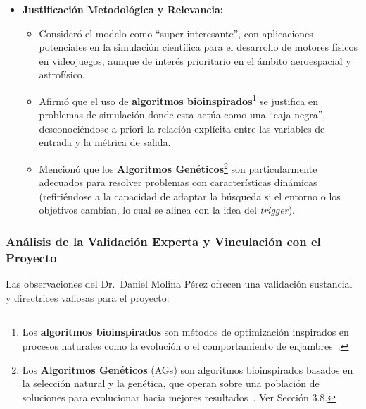 \begin{itemize}
    \item \textbf{Justificación Metodológica y Relevancia:}
    \begin{itemize}
        \item Consideró el modelo como ``super interesante'', con aplicaciones potenciales en la simulación científica para el desarrollo de motores físicos en videojuegos, aunque de interés prioritario en el ámbito aeroespacial y astrofísico.
        \item Afirmó que el uso de \textbf{algoritmos bioinspirados}\footnote{Los \textbf{algoritmos bioinspirados} son métodos de optimización inspirados en procesos naturales como la evolución o el comportamiento de enjambres~\cite{eiben2015, goldberg1989}.} se justifica en problemas de simulación donde esta actúa como una ``caja negra'', desconociéndose a priori la relación explícita entre las variables de entrada y la métrica de salida.
        \item Mencionó que los \textbf{Algoritmos Genéticos}\footnote{Los \textbf{Algoritmos Genéticos} (AGs) son algoritmos bioinspirados basados en la selección natural y la genética, que operan sobre una población de soluciones para evolucionar hacia mejores resultados~\cite{goldberg1989}. Ver Sección 3.8.} son particularmente adecuados para resolver problemas con características dinámicas (refiriéndose a la capacidad de adaptar la búsqueda si el entorno o los objetivos cambian, lo cual se alinea con la idea del \textit{trigger}).
    \end{itemize}
\end{itemize}

\subsubsection{Análisis de la Validación Experta y Vinculación con el Proyecto}

Las observaciones del Dr.\ Daniel Molina Pérez ofrecen una validación sustancial y directrices valiosas para el proyecto:

